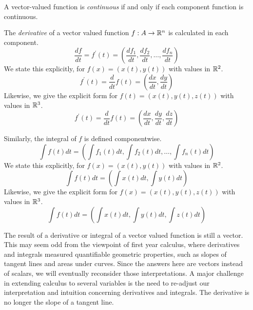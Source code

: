 \documentclass[fleqn,letterpaper]{report}
\begin{document}
\begin{defn}
A vector-valued function is \emph{continuous} if and only if each
component function is continuous. 
\end{defn} 

\begin{defn} 
The \emph{derivative} of a vector valued function $f: A
\rightarrow \mathbb{R}^n$ is calculated in each component.
\begin{equation*}
\frac{df}{dt} = f^\prime(t) = \left( \frac{df_1}{dt},
\frac{df_2}{dt}, \ldots, 
\frac{df_n}{dt} \right) 
\end{equation*}
We state this explicitly, for $f(x) = (x(t),y(t))$ with values
in $\mathbb{R}^2$.
\begin{equation*}
f^\prime(t) = \frac{d}{dt} f(t) = \left( \frac{dx}{dt},
\frac{dy}{dt}\right)
\end{equation*}
Likewise, we give the explicit form for $f(t) = (x(t),
y(t),z(t))$ with values in $\mathbb{R}^3$. 
\begin{equation*}
f^\prime(t) = \frac{d}{dt} f(t) = \left( \frac{dx}{dt},
\frac{dy}{dt}, \frac{dz}{dt} \right) 
\end{equation*}
\end{defn}

\begin{defn} 
Similarly, the integral of $f$ is defined componentwise.
\begin{equation*}
\int f(t) dt = \left( \int f_1(t) dt, \int f_2(t) dt, \ldots, 
\int f_n(t) dt \right)
\end{equation*}
We state this explicitly, for $f(x) = (x(t),y(t))$ with values
in $\mathbb{R}^2$. 
\begin{equation*}
\int f(t) dt = \left( \int x(t) dt, \int y(t) dt \right)
\end{equation*}
Likewise, we give the explicit form for $f(x) =
(x(t),y(t),z(t))$ with values in $\mathbb{R}^3$. 
\begin{equation*}
\int f(t) dt = \left( \int x(t) dt, \int y(t) dt, \int z(t)
dt \right)
\end{equation*}
\end{defn}

The result of a derivative or integral of a vector valued
function is still a vector. This may seem odd from the
viewpoint of first year calculus, where derivatives and
integrals measured quantifiable geometric properties, such as
slopes of tangent lines and areas under curves. Since the
answers here are vectors instead of scalars, we will
eventually reconsider those interpretations. A major challenge
in extending calculus to several variables is the need to
re-adjust our interpretation and intuition concerning
derivatives and integrals. The derivative is no longer the
slope of a tangent line. 
\end{document}
